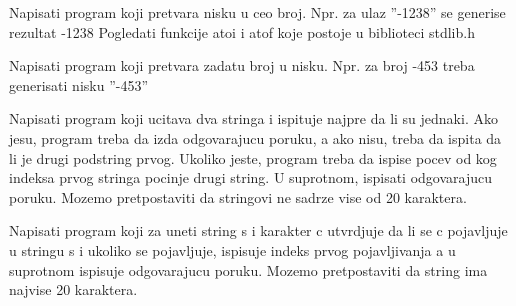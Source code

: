 \begin{Exercise}[label=v2.3_05] 
  Napisati program koji pretvara nisku u ceo broj.
  Npr. za ulaz ''-1238'' se generise rezultat -1238
  Pogledati funkcije atoi i atof koje postoje u biblioteci stdlib.h
\end{Exercise}
\begin{Answer}[ref=v2.3_05]
\end{Answer}

\begin{Exercise}[label=v2.3_06] 
	Napisati program koji pretvara zadatu broj u nisku. 
	Npr. za broj -453 treba generisati nisku ''-453''
\end{Exercise}
\begin{Answer}[ref=v2.3_06]
\end{Answer}

\begin{Exercise}[label=v2.3_07] 
   Napisati program koji ucitava dva stringa i ispituje najpre da li su jednaki. Ako jesu, program
   treba da izda odgovarajucu poruku, a ako nisu, treba da ispita da li je drugi podstring 
   prvog. Ukoliko jeste, program treba da ispise pocev od kog indeksa prvog
   stringa pocinje drugi string. U suprotnom, ispisati odgovarajucu poruku. Mozemo
   pretpostaviti da stringovi ne sadrze vise od 20 karaktera.
\end{Exercise}
\begin{Answer}[ref=v2.3_07]
\end{Answer}

\begin{Exercise}[label=v2.3_08] 
   Napisati program koji za uneti string s i karakter c utvrdjuje
   da li se c pojavljuje u stringu s i ukoliko se pojavljuje,
   ispisuje indeks prvog pojavljivanja a u suprotnom ispisuje
   odgovarajucu poruku. Mozemo pretpostaviti da string ima najvise
   20 karaktera.
\end{Exercise}
\begin{Answer}[ref=v2.3_08]
\end{Answer}

